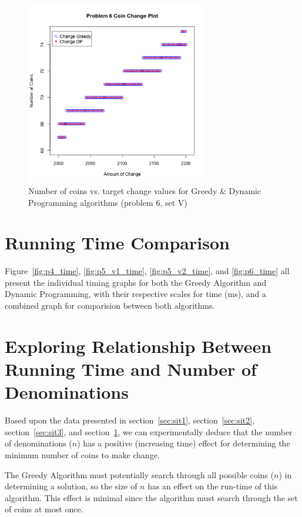 \documentclass[11pt]{scrreprt}
\begin{document}
\begin{figure}[!h]
\centering
\includegraphics[width=8cm]{situation3.png}
\caption{Number of coins vs. target change values for Greedy \& Dynamic Programming algorithms (problem 6, set V)}
\label{fig:p6}
\end{figure}

\section{Running Time Comparison}
\label{sec:timings}

Figure~\ref{fig:p4_time}, \ref{fig:p5_v1_time}, \ref{fig:p5_v2_time}, and \ref{fig:p6_time} all present the individual timing graphs for both the Greedy Algorithm and Dynamic Programming, with their respective scales for time (ms), and a combined graph for comparision between both algorithms.

\section{Exploring Relationship Between Running Time and Number of Denominations}

Based upon the data presented in section~\ref{sec:sit1}, section~\ref{sec:sit2}, section~\ref{sec:sit3}, and section~\ref{sec:timings}, we can experimentally deduce that the number of denominations ($n$) has a positive (increasing time) effect for determining the minimum number of coins to make change.

The Greedy Algorithm must potentially search through all possible coins ($n$) in determining a solution, so the size of $n$ has an effect on the run-time of this algorithm. This effect is minimal since the algorithm must search through the set of coins at most once.
\end{document}
